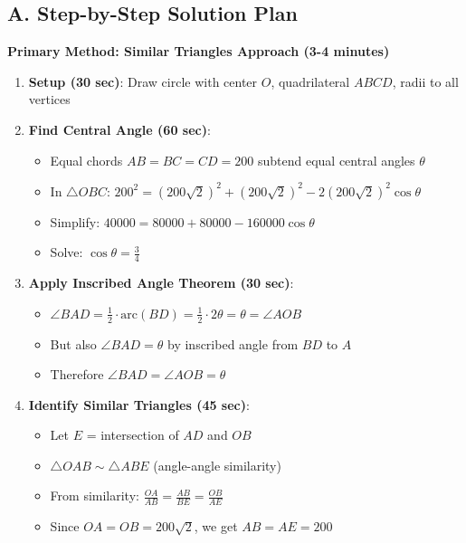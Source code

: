 \documentclass[12pt]{article}
\begin{document}
\begin{roadmapbox}
\subsection*{A. Step-by-Step Solution Plan}

\textbf{Primary Method: Similar Triangles Approach (3-4 minutes)}

\begin{enumerate}[leftmargin=*]
    \item \textbf{Setup (30 sec)}: Draw circle with center $O$, quadrilateral $ABCD$, radii to all vertices
    
    \item \textbf{Find Central Angle (60 sec)}: 
    \begin{itemize}
        \item Equal chords $AB = BC = CD = 200$ subtend equal central angles $\theta$
        \item In $\triangle OBC$: $200^2 = (200\sqrt{2})^2 + (200\sqrt{2})^2 - 2(200\sqrt{2})^2\cos\theta$
        \item Simplify: $40000 = 80000 + 80000 - 160000\cos\theta$
        \item Solve: $\cos\theta = \frac{3}{4}$
    \end{itemize}
    
    \item \textbf{Apply Inscribed Angle Theorem (30 sec)}:
    \begin{itemize}
        \item $\angle BAD = \frac{1}{2} \cdot \text{arc}(BD) = \frac{1}{2} \cdot 2\theta = \theta = \angle AOB$
        \item But also $\angle BAD = \theta$ by inscribed angle from $BD$ to $A$
        \item Therefore $\angle BAD = \angle AOB = \theta$
    \end{itemize}
    
    \item \textbf{Identify Similar Triangles (45 sec)}:
    \begin{itemize}
        \item Let $E$ = intersection of $AD$ and $OB$
        \item $\triangle OAB \sim \triangle ABE$ (angle-angle similarity)
        \item From similarity: $\frac{OA}{AB} = \frac{AB}{BE} = \frac{OB}{AE}$
        \item Since $OA = OB = 200\sqrt{2}$, we get $AB = AE = 200$
    \end{itemize}
    

\end{enumerate}
\end{roadmapbox}
\end{document}
